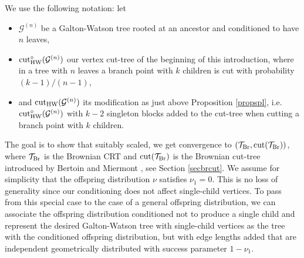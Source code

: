 \documentclass[11pt,a4paper]{article}
\newcommand{\cG}{\mathcal{G}}
\newcommand{\cT}{\mathcal{T}}
\newcommand{\modcut}{{\rm cut}_{\rm HW}}
\newcommand{\ourcut}{{\rm cut}_{\rm HW}^\circ}
\begin{document}

We use the following notation: let
\begin{itemize}\item $\cG^{(n)}$ be a Galton-Watson tree rooted at an ancestor and conditioned to have $n$ leaves,
  \item $\ourcut(\cG^{(n)})$ our vertex cut-tree of the beginning of this introduction, where in a tree with $n$ leaves a branch point with $k$ children is
    cut with probability $(k-1)/(n-1)$,
  \item and $\modcut(\cG^{(n)})$ its modification as just above Proposition \ref{propspl}, i.e.\ $\ourcut(\cG^{(n)})$ with $k-2$ singleton blocks added to the cut-tree when cutting a
    branch point with $k$ children.
\end{itemize}
The goal is to show that suitably scaled, we get convergence to $(\cT_{\rm Br},{\rm cut}(\cT_{\rm Br}))$, where $\cT_{\rm Br}$ is the Brownian CRT and
${\rm cut}(\cT_{\rm Br})$ is the Brownian cut-tree introduced by Bertoin and Miermont \cite{BM}, see Section \ref{secbrcut}. We assume for simplicity that the offspring distribution $\nu$ satisfies $\nu_1=0$. This is no loss of generality since
our conditioning does not affect single-child vertices. To pass from this special case to the case of a general offspring distribution, we can associate the offspring
distribution conditioned not to produce a single child and represent the desired Galton-Watson tree with single-child vertices as the tree with the conditioned offspring
distribution, but with edge lengths added that are independent geometrically distributed with success parameter $1-\nu_1$.
\end{document}
